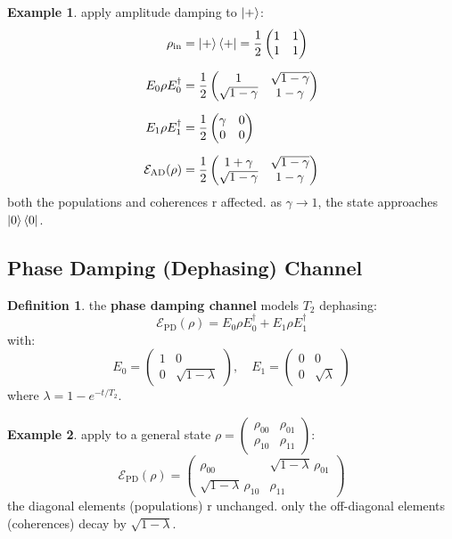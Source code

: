 \documentclass[11pt,a4paper]{article}
\theoremstyle{definition}
\newtheorem{definition}{Definition}[section]
\newtheorem{example}{Example}[section]
\theoremstyle{remark}
\begin{document}
\begin{example}
apply amplitude damping to $\ket{+}$:
\begin{align}
\rho_{\text{in}} &= \ket{+}\bra{+} = \frac{1}{2}\begin{pmatrix} 1 & 1 \\ 1 & 1 \end{pmatrix} \\[6pt]
E_0\rho E_0^\dagger &= \frac{1}{2}\begin{pmatrix} 1 & \sqrt{1-\gamma} \\ \sqrt{1-\gamma} & 1-\gamma \end{pmatrix} \\[6pt]
E_1\rho E_1^\dagger &= \frac{1}{2}\begin{pmatrix} \gamma & 0 \\ 0 & 0 \end{pmatrix} \\[6pt]
\mathcal{E}_{\text{AD}}(\rho) &= \frac{1}{2}\begin{pmatrix} 1+\gamma & \sqrt{1-\gamma} \\ \sqrt{1-\gamma} & 1-\gamma \end{pmatrix}
\end{align}
both the populations and coherences r affected. as $\gamma \to 1$, the state approaches $\ket{0}\bra{0}$.
\end{example}

\subsection{Phase Damping (Dephasing) Channel}

\begin{definition}
the \textbf{phase damping channel} models $T_2$ dephasing:
\[
\mathcal{E}_{\text{PD}}(\rho) = E_0 \rho E_0^\dagger + E_1 \rho E_1^\dagger
\]
with:
\[
E_0 = \begin{pmatrix} 1 & 0 \\ 0 & \sqrt{1-\lambda} \end{pmatrix}, \quad E_1 = \begin{pmatrix} 0 & 0 \\ 0 & \sqrt{\lambda} \end{pmatrix}
\]
where $\lambda = 1 - e^{-t/T_2}$.
\end{definition}

\begin{example}
apply to a general state $\rho = \begin{pmatrix} \rho_{00} & \rho_{01} \\ \rho_{10} & \rho_{11} \end{pmatrix}$:
\[
\mathcal{E}_{\text{PD}}(\rho) = \begin{pmatrix} \rho_{00} & \sqrt{1-\lambda}\,\rho_{01} \\ \sqrt{1-\lambda}\,\rho_{10} & \rho_{11} \end{pmatrix}
\]
the diagonal elements (populations) r unchanged. only the off-diagonal elements (coherences) decay by $\sqrt{1-\lambda}$.
\end{example}
\end{document}
